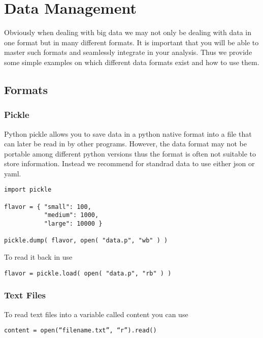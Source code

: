 \chapter{Data Management}

\FILENAME

Obviously when dealing with big data we may not only be dealing with
data in one format but in many different formats. It is important that
you will be able to master such formats and seamlessly integrate in
your analysis. Thus we provide some simple examples on which different
data formats exist and how to use them.

\section{Formats}

\subsection{Pickle}

Python pickle allows you to save data in a python native format into a file
that can later be read in by other programs. However, the data format
may not be portable among different python versions thus the format is
often not suitable to store information. Instead we recommend for
standrad data to use either json or yaml.

\begin{verbatim}
import pickle

flavor = { "small": 100, 
           "medium": 1000,
           "large": 10000 }

pickle.dump( flavor, open( "data.p", "wb" ) )

\end{verbatim}

To read it back in use

\begin{verbatim}
flavor = pickle.load( open( "data.p", "rb" ) )
\end{verbatim}

\subsection{Text Files}

To read text files into a variable called content  you can use 

\begin{verbatim}
content = open(“filename.txt”, “r”).read() 
\end{verbatim}

